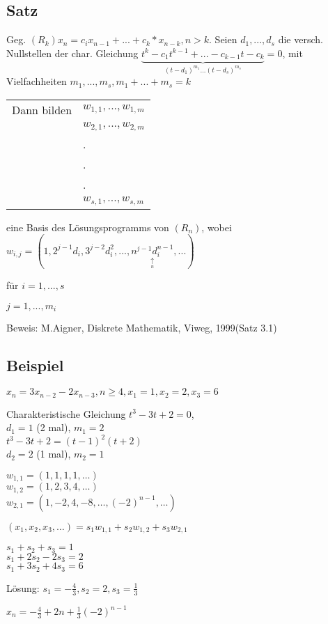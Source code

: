 \subsection{Satz}%
Geg. $(R_k) x_n = c_ix_{n-1}+...+c_k*x_{n-k}, n>k.$ Seien $d_1,...,d_s$ die versch. Nullstellen der char. Gleichung $\underbrace{t^k-c_1t^{k-1}+...-c_{k-1}t-c_k}_{(t-d_1)^{m_1}...(t-d_s)^{m_s}}=0$, mit Vielfachheiten $m_1,...,m_s,m_1+...+m_s=k$ 

\begin{tabular}{l l}
	Dann bilden & $w_{1,1},...,w_{1,m}$\\
	&$w_{2,1},...,w_{2,m}$\\
	&.\\
	&.\\
	&.\\
	&$w_{s,1},...,w_{s,m}$\\
\end{tabular}

eine Basis des Lösungsprogramms von $(R_n)$, wobei $w_{i,j}= (1,2^{j-1}d_i,3^{j-2}d_i^2,...,\underset{\underset{n}{\uparrow}}{n^{j-1}d_i^{n-1}},...)$

für $i=1,...,s$

\quad $j=1,...,m_i$

Beweis: M.Aigner, Diskrete Mathematik, Viweg, 1999(Satz 3.1)


\subsection{Beispiel} %

$x_n = 3x_{n-2} -2x_{n-3}, n \geq 4, x_1 = 1, x_2 = 2, x_3 = 6$

Charakteristische Gleichung $t^3-3t+2 = 0$, 
\\ $d_1 = 1$ (2 mal), $m_1 =2$
\\$t^3 -3t + 2 = (t-1)^2(t+2)$
\\$d_2 =2$ (1 mal), $m_2 = 1$

$w_{1,1} = (1, 1, 1, 1, \dots)$
\\ $w_{1, 2} = (1, 2, 3, 4, \dots)$
\\ $w_{2, 1} = (1, -2, 4, -8, \dots, (-2)^{n-1}, \dots)$

$(x_1, x_2, x_3, \dots) = s_1w_{1, 1} + s_2w_{1, 2} + s_3w_{2,1}$

$s_1 + s_2 + s_3 = 1$
\\$s_1 + 2s_2 -2s_3 = 2$ 
\\$s_1 + 3s_2 + 4s_3 = 6$

Lösung: $s_1 = - \frac{4}{3}, s_2 = 2, s_3 = \frac{1}{3}$

$x_n = -\frac{4}{3} + 2n + \frac{1}{3}(-2)^{n-1}$


























